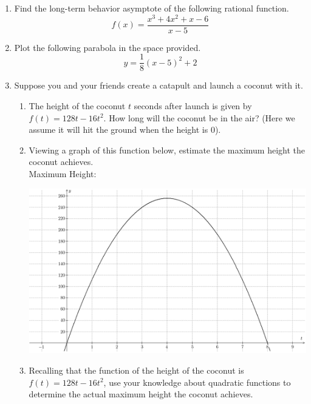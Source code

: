 \documentclass{article}
\begin{document}
\begin{enumerate}
\begin{center}
\CartesianPlane[axes=yes,h=10,w=10]
\end{center} \vspace{1cm}

\newpage

\item Find the long-term behavior asymptote of the following rational function. \[ f(x) = \frac{x^3 + 4x^2 + x - 6}{x - 5} \] \vspace{6cm}

\item Plot the following parabola in the space provided. \[ y = \frac{1}{8} \left(x - 5\right)^2 +2 \]

\begin{center}
\CartesianPlane[axes=yes,h=10,w=10]
\end{center} \vspace{1cm}

\newpage

\item Suppose you and your friends create a catapult and launch a coconut with it.
\begin{enumerate}
\item The height of the coconut $t$ seconds after launch is given by $f(t)=128t-16t^2$. How long will the coconut be in the air? (Here we assume it will hit the ground when the height is $0$).
\vspace{1in}
\item Viewing a graph of this function below, estimate the maximum height the coconut achieves. \vspace{.25in}\\ 
Maximum Height: \\ \vspace{.25in}
\begin{center}
\includegraphics[scale=.5]{ca/tex/coconut.png}
\end{center}
\item Recalling that the function of the height of the coconut is $f(t)=128t-16t^2$, use your knowledge about quadratic functions to determine the actual maximum height the coconut achieves.
\end{enumerate}
\end{enumerate}
\end{document}
